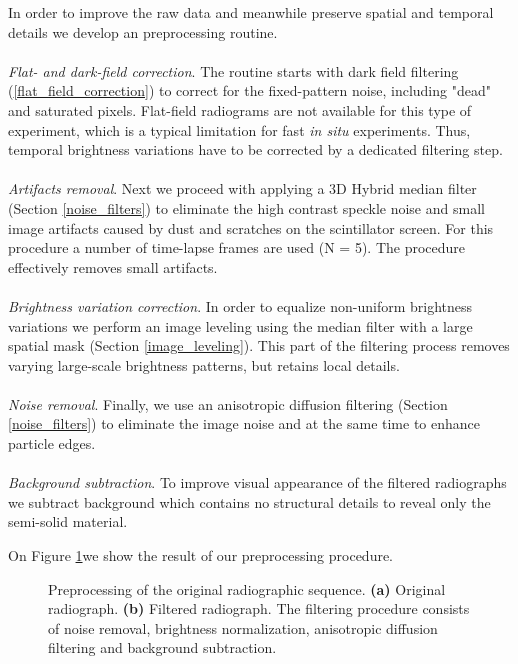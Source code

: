 In order to improve the raw data and meanwhile preserve spatial and temporal details we develop an preprocessing routine.
\\
\\
\textit{Flat- and dark-field correction}. The routine starts with dark field filtering (\ref{flat_field_correction}) to correct for the fixed-pattern noise, including "dead" and saturated pixels. Flat-field radiograms are not available for this type of experiment, which is a typical limitation for fast \textit{in situ} experiments. Thus, temporal brightness variations have to be corrected by a dedicated filtering step.
\\
\\
\textit{Artifacts removal}. Next we proceed with applying a 3D Hybrid median filter (Section \ref{noise_filters}) to eliminate the high contrast speckle noise and small image artifacts caused by dust and scratches on the scintillator screen. For this procedure a number of time-lapse frames are used (N = 5). The procedure effectively removes small artifacts.
\\
\\
\textit{Brightness variation correction}. In order to equalize  non-uniform brightness variations we perform an image leveling using the median filter with a large spatial mask (Section \ref{image_leveling}). This part of the filtering process removes varying large-scale brightness patterns, but retains local details. 
\\
\\
\textit{Noise removal}. Finally, we use an anisotropic diffusion filtering (Section \ref{noise_filters}) to eliminate the image noise and at the same time to enhance particle edges.
\\
\\
\textit{Background subtraction}. To improve visual appearance of the filtered radiographs we subtract background which contains no structural details to reveal only the semi-solid material. 

\noindent On Figure \ref{fig:app_thixo_radio_filtered}we show  the result of our preprocessing procedure.

\begin{figure}[ht]
  \centerline{
    \mbox{}
    \mbox{}
  }
  
  \caption{Preprocessing  of the original radiographic sequence. \textbf{(a)}  Original radiograph. \textbf{(b)} Filtered radiograph. The filtering procedure consists of noise removal, brightness normalization, anisotropic diffusion filtering and background subtraction.}
  \label{fig:app_thixo_radio_filtered}
\end{figure}


